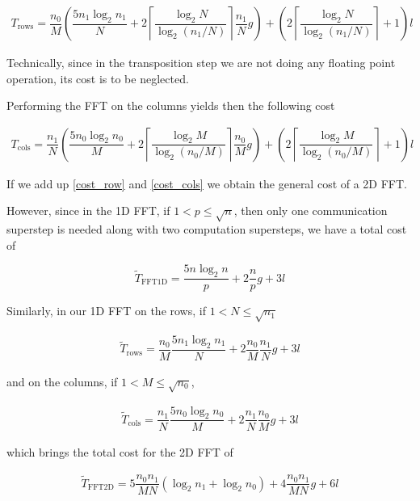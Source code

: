 \documentclass[a4paper,11pt]{article}
\begin{document}
\begin{align}
\label{cost_row} T_{\text{rows}} = \dfrac{n_0}{M} \left( \dfrac{5n_1 \log_2 n_1}{N} + 2 \left\lceil \dfrac{\log_2 N}{\log_2 (n_1/N)} \right\rceil \dfrac{n_1}{N} g \right) + \left( 2 \left\lceil \dfrac{\log_2 N}{\log_2 (n_1/N)} \right\rceil +1 \right) l 
\end{align}

Technically, since in the transposition step we are not doing any floating point operation, its cost is to be neglected.

Performing the FFT on the columns yields then the following cost

\begin{align} 
\label{cost_cols} T_{\text{cols}} = \dfrac{n_1}{N} \left( \dfrac{5n_0 \log_2 n_0}{M} + 2 \left\lceil \dfrac{\log_2 M}{\log_2 (n_0/M)} \right\rceil \dfrac{n_0}{M} g \right) + \left( 2 \left\lceil \dfrac{\log_2 M}{\log_2 (n_0/M)} \right\rceil +1 \right) l
\end{align}

If we add up \eqref{cost_row} and \eqref{cost_cols} we obtain the general cost of a 2D FFT.

However, since in the 1D FFT, if $1 < p \leq \sqrt{n}$, then only one communication superstep is needed along with two computation supersteps, we have a total cost of

$$\tilde{T}_{\text{FFT1D}} = \dfrac{5n \log_2 n}{p} + 2 \dfrac{n}{p} g + 3l$$

Similarly, in our 1D FFT on the rows, if $1< N \leq \sqrt{n_1}$

\begin{align}
 \label{cost1} \tilde{T}_{\text{rows}} = \dfrac{n_0}{M} \dfrac{5n_1 \log_2 n_1}{N} + 2 \dfrac{n_0}{M} \dfrac{n_1}{N} g + 3l
\end{align}

and on the columns, if $1< M \leq \sqrt{n_0}$,

\begin{align}
 \label{cost2} \tilde{T}_{\text{cols}} = \dfrac{n_1}{N} \dfrac{5n_0 \log_2 n_0}{M} + 2 \dfrac{n_1}{N} \dfrac{n_0}{M} g + 3l
\end{align}

which brings the total cost for the 2D FFT of

\begin{align}
 \label{total_cost} \tilde{T}_{\text{FFT2D}}  = 5 \dfrac{n_0 n_1}{MN} \left( \log_2 n_1 + \log_2 n_0 \right) + 4 \dfrac{n_0 n_1}{MN}g + 6l
\end{align}
\end{document}
